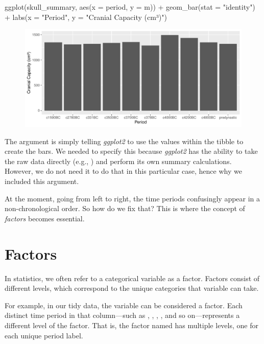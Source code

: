 \begin{inR}
ggplot(skull_summary, aes(x = period, y = m)) +
  geom_bar(stat = "identity") +
  labs(x = "Period", y = "Cranial Capacity (cm³)")
\end{inR}

\vspace{2em}

\begin{figure}[H]
\includegraphics[scale = .75]{graphics/ch3Figs/bar_1.pdf}
\end{figure}

The argument  is simply telling \textit{ggplot2} to use the values within the  tibble to create the bars.  We needed to specify this because \textit{ggplot2} has the ability to take the raw data directly (e.g., ) and perform its own summary calculations. However, we do not need it to do that in this particular case, hence why we included this argument.

At the moment, going from left to right, the time periods confusingly appear in a non-chronological order. So how do we fix that? This is where the concept of \textit{factors} becomes essential.

\section{Factors}

In statistics, we often refer to a categorical variable as a \gls{factor}. Factors consist of different \glspl{level}, which correspond to the unique categories that variable can take.

For example, in our tidy data, the variable  can be considered a factor. Each distinct time period in that column—such as , , , , and so on—represents a different level of the factor. That is, the factor named  has multiple levels, one for each unique period label.

